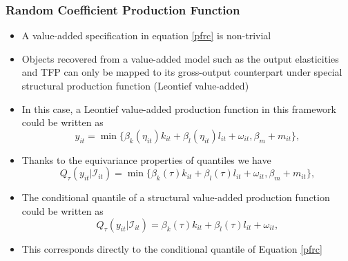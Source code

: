 \documentclass[xcolor={dvipsnames}, notheorems]{beamer}
\theoremstyle{plain}
\begin{document}

\begin{frame}
\frametitle{Random Coefficient Production Function}
\begin{itemize}
\item  A value-added specification in equation \eqref{pfrc} is non-trivial
\item Objects recovered from a value-added model such as the output elasticities and TFP can only be mapped to its gross-output counterpart under special structural production function (Leontief value-added)
\item In this case, a Leontief value-added production function in this framework could be written as
\begin{equation*}
y_{it}=\min\{\beta_{k}(\eta_{it})k_{it}+\beta_{l}(\eta_{it})l_{it}+\omega_{it}, \beta_{m}+m_{it}\},
\end{equation*}
\item Thanks to the equivariance properties of quantiles we have
\begin{equation*} 
Q_{\tau}(y_{it}|\mathcal{I}_{it})=\min\{\beta_{k}(\tau)k_{it}+\beta_{l}(\tau)l_{it}+\omega_{it}, \beta_{m}+m_{it}\},
\end{equation*}
\item The conditional quantile of a structural value-added production function could be written as
\begin{equation*}
Q_{\tau}(y_{it}|\mathcal{I}_{it})=\beta_{k}(\tau)k_{it}+\beta_{l}(\tau)l_{it}+\omega_{it},
\end{equation*}
\item This corresponds directly to the conditional quantile of Equation \eqref{pfrc}
\end{itemize}
\end{frame}

\end{document}
